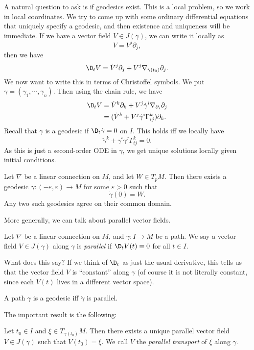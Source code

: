 \documentclass[a4paper]{article}
\begin{document}
A natural question to ask is if geodesics exist. This is a local problem, so we work in local coordinates. We try to come up with some ordinary differential equations that uniquely specify a geodesic, and then existence and uniqueness will be immediate. If we have a vector field $V \in J(\gamma)$, we can write it locally as
\[
  V = V^j \partial_j,
\]
then we have
\[
  \D_t V = \dot{V}^j \partial_j + V^j \nabla_{\dot{\gamma}(t_0)} \partial_j.
\]
We now want to write this in terms of Christoffel symbols. We put $\gamma = (\gamma_1, \cdots, \gamma_n)$. Then using the chain rule, we have
\begin{align*}
  \D_t V &= \dot{V}^k \partial_k + V^j \dot{\gamma}^i \nabla_{\partial_i} \partial_j\\
  &= (\dot{V}^k + V^j \dot{\gamma}^i \Gamma_{ij}^k)\partial_k.
\end{align*}
Recall that $\gamma$ is a geodesic if $\D_t \dot{\gamma} = 0$ on $I$. This holds iff we locally have
\[
  \ddot{\gamma}^k + \dot{\gamma}^i \dot{\gamma}^j \Gamma_{ij}^k = 0.
\]
As this is just a second-order ODE in $\gamma$, we get unique solutions locally given initial conditions.\
\begin{thm}
  Let $\nabla$ be a linear connection on $M$, and let $W \in T_pM$. Then there exists a geodesic $\gamma: (-\varepsilon, \varepsilon) \to M$ for some $\varepsilon > 0$ such that
  \[
    \dot{\gamma}(0) = W.
  \]
  Any two such geodesics agree on their common domain.
\end{thm}

More generally, we can talk about parallel vector fields.
\begin{defi}
  Let $\nabla$ be a linear connection on $M$, and $\gamma: I \to M$ be a path. We say a vector field $V \in J(\gamma)$ along $\gamma$ is \emph{parallel} if $\D_t V(t) \equiv 0$ for all $t \in I$.
\end{defi}
What does this say? If we think of $\D_t$ as just the usual derivative, this tells us that the vector field $V$ is ``constant'' along $\gamma$ (of course it is not literally constant, since each $V(t)$ lives in a different vector space).

\begin{eg}
  A path $\gamma$ is a geodesic iff $\dot{\gamma}$ is parallel.
\end{eg}
The important result is the following:
\begin{lemma}
  Let $t_0 \in I$ and $\xi \in T_{\gamma(t_0)} M$. Then there exists a unique parallel vector field $V \in J(\gamma)$ such that $V(t_0) = \xi$. We call $V$ the \emph{parallel transport} of $\xi$ along $\gamma$.
\end{lemma}
\end{document}
